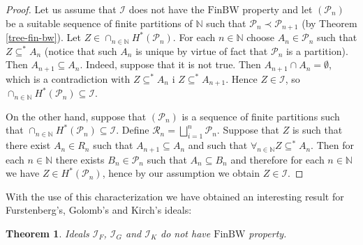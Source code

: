 \documentclass{amsart}
\newtheorem{thm}{Theorem}
\theoremstyle{definition}
\theoremstyle{definition}
\newcommand{\N}{{\mathbb N}}
\newcommand{\I}{\mathcal I}
\newcommand{\finbw}{\text{FinBW}}
\begin{document}
\begin{proof}
Let us assume that $\I$ does not have the $\finbw$ property and let
$(\mathcal{P}_n)$ be a suitable sequence of finite partitions of $\N$
such that $\mathcal{P}_n \prec \mathcal{P}_{n + 1}$ (by Theorem \ref{tree-fin-bw}). 
Let $Z \in \cap_{n\in\N} H^{*}(\mathcal{P}_n)$. For each $n\in\N$ choose $A_n\in \mathcal{P}_n$
such that $Z \subseteq^* A_n$ (notice that such $A_n$ is unique by virtue of fact that  
$\mathcal{P}_n$ is a partition). Then $A_{n+1} \subseteq A_n$. 
Indeed, suppose that it is not true.
Then $A_{n+1} \cap A_n = \emptyset$, which is a contradiction with $Z \subseteq^* A_n$ i $Z \subseteq^* A_{n + 1}$. 
Hence $Z \in \I$, so $\cap_{n\in\N} H^{*}(\mathcal{P}_n) \subseteq \I$.

On the other hand, suppose that $(\mathcal{P}_n)$ is a sequence 
of finite partitions such that $\cap_{n\in\N} H^{*}(\mathcal{P}_n) \subseteq \I$. 
Define $\mathcal{R}_n = \bigsqcup_{i=1}^n \mathcal{P}_n$. 
Suppose that $Z$ is such that there exist $A_n \in R_n$ such that $A_{n+1} \subseteq A_n$ and such that 
$\forall_{n\in\N} Z \subseteq^* A_n$. Then for each $n\in\N$ there exists $B_n \in \mathcal{P}_n$ 
such that $A_n \subseteq B_n$ and therefore for each $n\in\N$ we have $Z \in H^{*}(\mathcal{P}_n)$, 
hence by our assumption we obtain $Z\in\I$.
\end{proof}

With the use of this characterization we have obtained an interesting result for Furstenberg's, Golomb's and Kirch's ideals: 

\begin{thm}
Ideals $\I_F$, $\I_G$ and $\I_K$ do not have $\finbw$ property.
\end{thm}
\end{document}
